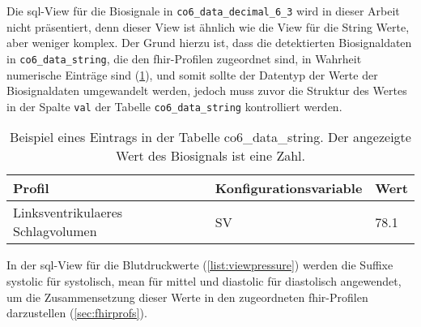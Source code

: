 Die \ac{sql}-View für die Biosignale in \texttt{co6\_data\_decimal\_6\_3} wird in dieser Arbeit nicht präsentiert, denn dieser View ist ähnlich wie die View für die String Werte, aber weniger komplex. Der Grund hierzu ist, dass die detektierten Biosignaldaten in \texttt{co6\_data\_string}, die den \ac{fhir}-Profilen zugeordnet sind, in Wahrheit numerische Einträge sind (\ref{tab:stringvalue}), und somit sollte der Datentyp der Werte der Biosignaldaten umgewandelt werden, jedoch muss zuvor die Struktur des Wertes in der Spalte \texttt{val} der Tabelle \texttt{co6\_data\_string} kontrolliert werden.
\clearpage
\begin{table}[ht]
	\centering 
	\caption[Eintrag in der Tabelle co6\_data\_string]{Beispiel eines Eintrags in der Tabelle co6\_data\_string. Der angezeigte Wert des Biosignals ist eine Zahl.}
	\label{tab:stringvalue}
	\begin{tabular}{|l|l|l|}
		\hline
		\bfseries Profil & \bfseries Konfigurationsvariable & \bfseries Wert \\ \hline
		Linksventrikulaeres Schlagvolumen & SV & 78.1 \\ \hline
	\end{tabular}
\end{table}

In der \ac{sql}-View für die Blutdruckwerte (\ref{list:viewpressure}) werden die Suffixe \glqq systolic\grqq{} für systolisch, \glqq mean\grqq{} für mittel und \glqq diastolic\grqq{} für diastolisch angewendet, um die Zusammensetzung dieser Werte in den zugeordneten \ac{fhir}-Profilen darzustellen (\ref{sec:fhirprofs}). 

